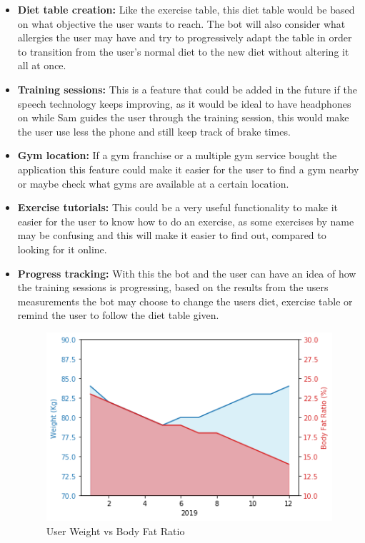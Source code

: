 \begin{itemize}
	\item{\textbf{Diet table creation:} Like the exercise table, this diet table would be based on what objective the user wants to reach. The bot will also consider what allergies the user may have and try to progressively adapt the table in order to transition from the user’s normal diet to the new diet without altering it all at once.}
	\item{\textbf{Training sessions:} This is a feature that could be added in the future if the speech technology keeps improving, as it would be ideal to have headphones on while Sam guides the user through the training session, this would make the user use less the phone and still keep track of brake times.}
	\item{\textbf{Gym location:} If a gym franchise or a multiple gym service bought the application this feature could make it easier for the user to find a gym nearby or maybe check what gyms are available at a certain location.}
	\item{\textbf{Exercise tutorials:} This could be a very useful functionality to make it easier for the user to know how to do an exercise, as some exercises by name may be confusing and this will make it easier to find out, compared to looking for it online.}
	\item{\textbf{Progress tracking:} With this the bot and the user can have an idea of how the training sessions is progressing, based on the results from the users measurements  the bot may choose to change the users diet, exercise table or remind the user to follow the diet table given.
		\begin{center}
			\begin{figure}[h!]
				\centering
				\includegraphics[scale=0.7]{./images/4-weight-bfr}
				\caption{User Weight vs Body Fat Ratio}

\end{figure}
\end{center}}
\end{itemize}
